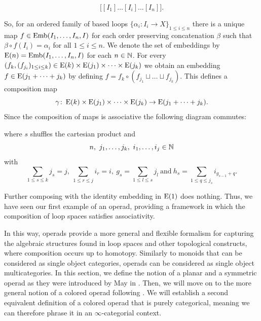    \[
        \big[[I_1] \dots [I_i] \dots [I_n]\big].
    \]
    
    So, for an ordered family of based loops $\{\alpha_i \colon I_i \to X\}_{1 \leq i
    \leq n}$ there is a unique map $f \in \operatorname{Emb}(I_1, \dots, I_n, I)$ for each
    order preserving concatenation $\beta$ such that $\beta \circ f (I_i) =
    \alpha_i$ for all $1 \leq i \leq n$. We denote the set of embeddings by
    $\operatorname{E}(n) = \operatorname{Emb}(I_1, \dots, I_n, I)$ for each $n \in \mathbb{N}$. For every $(f_k,
    (f_{j_i})_{1 \leq i \leq k}) \in  \operatorname{E}(k) \times \operatorname{E}(j_1) \times \dots \times
    \operatorname{E}(j_k)$ we obtain an embedding $f \in \operatorname{E}(j_1 + \dots + j_k)$ by defining $f
    = f_k \circ (f_{j_1} \sqcup \dots \sqcup f_{j_k})$. This defines a
    composition map 
    \[
        \gamma \colon \operatorname{E}(k) \times \operatorname{E}(j_1) \times \dots \times \operatorname{E}(j_k) \to \operatorname{E}(j_1 + \dots + j_k).
    \]
    Since the composition of maps is associative the following diagram commutes:
    \begin{center}
    \end{center}
    where $s$ shuffles the cartesian product and
    \[
                n,  \ j_1, \dots, j_k, \ i_1, \dots, i_j \in \N
            \]
            with
            \[
                \sum_{1 \leq s \leq k} j_s = j, ~ \sum_{1 \leq r \leq j} i_r = i, \ g_s = \sum_{1 \leq l \leq s} j_l \ \text{and} \ h_s = \sum_{1 \leq q \leq j_s} i_{g_{s-1}+q}.
            \]
    
    Further composing with the identity embedding in $\operatorname{E}(1)$ does nothing. Thus,
    we have seen our first example of an operad, providing a framework in which
    the composition of loop spaces satisfies associativity.

    In this way, operads provide a more general and flexible formalism for
    capturing the algebraic structures found in loop spaces and other
    topological constructs, where composition occurs up to homotopy. Similarly
    to monoids that can be considered as single object categories, operads can
    be considered as single object multicategories. In this section, we define
    the notion of a planar and a symmetric operad as they were introduced by May
    in \cite{may}. Then, we will move on to the more general notion of a colored
    operad following \cite{ha}. We will establish a second equivalent definition
    of a colored operad that is purely categorical, meaning we can therefore
    phrase it in an $\infty$-categorial context.
    
